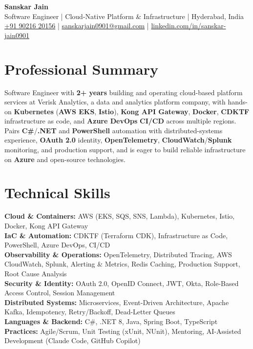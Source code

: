 \documentclass[a4paper,10pt]{article}
\begin{document}
\begin{center}
    {\LARGE \textbf{Sanskar Jain}} \\
    \vspace{2pt}
    Software Engineer \;|\; Cloud-Native Platform \& Infrastructure \;|\; Hyderabad, India \\
    \href{tel:+919021620156}{+91 90216 20156} \;|\;
    \href{mailto:sanskarjain0901@gmail.com}{sanskarjain0901@gmail.com} \;|\;
    \href{https://www.linkedin.com/in/sanskar-jain0901/}{linkedin.com/in/sanskar-jain0901}
\end{center}

\section*{Professional Summary}
Software Engineer with \textbf{2+ years} building and operating cloud-based platform services at Verisk Analytics, a data and analytics platform company, with hands-on \textbf{Kubernetes} (\textbf{AWS EKS}, \textbf{Istio}), \textbf{Kong API Gateway}, \textbf{Docker}, \textbf{CDKTF} infrastructure as code, and \textbf{Azure DevOps} \textbf{CI/CD} across multiple regions.
Pairs \textbf{C\#}/\textbf{.NET} and \textbf{PowerShell} automation with distributed-systems experience, \textbf{OAuth 2.0} identity, \textbf{OpenTelemetry}, \textbf{CloudWatch}/\textbf{Splunk} monitoring, and production support, and is eager to build reliable infrastructure on \textbf{Azure} and open-source technologies.

\section*{Technical Skills}
\begin{sloppypar}
\noindent
\textbf{Cloud \& Containers:} AWS (EKS, SQS, SNS, Lambda), Kubernetes, Istio, Docker, Kong API Gateway \\
\textbf{IaC \& Automation:} CDKTF (Terraform CDK), Infrastructure as Code, PowerShell, Azure DevOps, CI/CD \\
\textbf{Observability \& Operations:} OpenTelemetry, Distributed Tracing, AWS CloudWatch, Splunk, Alerting \& Metrics, Redis Caching, Production Support, Root Cause Analysis \\
\textbf{Security \& Identity:} OAuth 2.0, OpenID Connect, JWT, Okta, Role-Based Access Control, Session Management \\
\textbf{Distributed Systems:} Microservices, Event-Driven Architecture, Apache Kafka, Idempotency, Retry/Backoff, Dead-Letter Queues \\
\textbf{Languages \& Backend:} C\#, .NET 8, Java, Spring Boot, TypeScript \\
\textbf{Practices:} Agile/Scrum, Unit Testing (xUnit, NUnit), Mentoring, AI-Assisted Development (Claude Code, GitHub Copilot)
\end{sloppypar}
\end{document}

